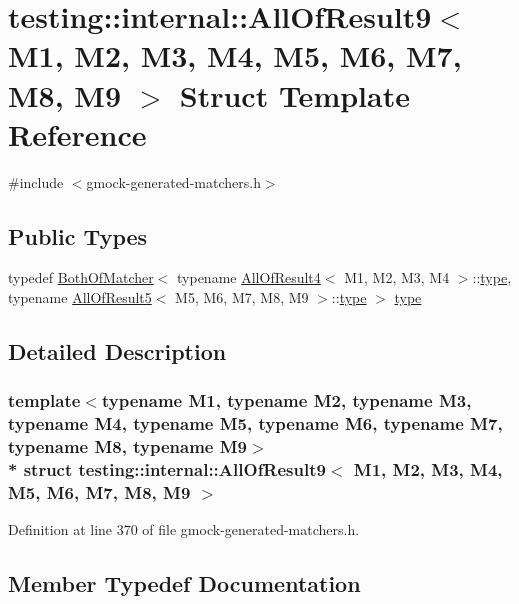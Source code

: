 \hypertarget{structtesting_1_1internal_1_1_all_of_result9}{}\section{testing\+:\+:internal\+:\+:All\+Of\+Result9$<$ M1, M2, M3, M4, M5, M6, M7, M8, M9 $>$ Struct Template Reference}
\label{structtesting_1_1internal_1_1_all_of_result9}


{\ttfamily \#include $<$gmock-\/generated-\/matchers.\+h$>$}

\subsection*{Public Types}
\begin{DoxyCompactItemize}
\item 
typedef \hyperlink{classtesting_1_1internal_1_1_both_of_matcher}{Both\+Of\+Matcher}$<$ typename \hyperlink{structtesting_1_1internal_1_1_all_of_result4}{All\+Of\+Result4}$<$ M1, M2, M3, M4 $>$\+::\hyperlink{structtesting_1_1internal_1_1_all_of_result9_ade56e18d2e0b745968b87fc394710edc}{type}, typename \hyperlink{structtesting_1_1internal_1_1_all_of_result5}{All\+Of\+Result5}$<$ M5, M6, M7, M8, M9 $>$\+::\hyperlink{structtesting_1_1internal_1_1_all_of_result9_ade56e18d2e0b745968b87fc394710edc}{type} $>$ \hyperlink{structtesting_1_1internal_1_1_all_of_result9_ade56e18d2e0b745968b87fc394710edc}{type}
\end{DoxyCompactItemize}


\subsection{Detailed Description}
\subsubsection*{template$<$typename M1, typename M2, typename M3, typename M4, typename M5, typename M6, typename M7, typename M8, typename M9$>$\\*
struct testing\+::internal\+::\+All\+Of\+Result9$<$ M1, M2, M3, M4, M5, M6, M7, M8, M9 $>$}



Definition at line 370 of file gmock-\/generated-\/matchers.\+h.



\subsection{Member Typedef Documentation}
